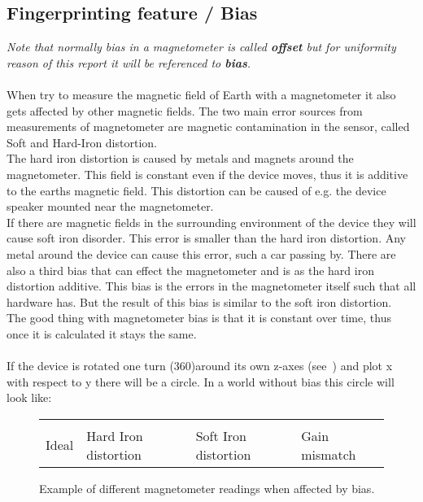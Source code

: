 \subsection{Fingerprinting feature / Bias}
\textit{Note that normally bias in a magnetometer is called \textbf{offset} but for uniformity reason of this report it will be referenced to \textbf{bias}.}\\
\\
When try to measure the magnetic field of Earth with a magnetometer it also gets affected by other magnetic fields. The two main error sources from measurements of magnetometer are magnetic contamination in the sensor, called Soft and Hard-Iron distortion. \\
The hard iron distortion is caused by metals and magnets around the magnetometer. This field is constant even if the device moves, thus it is additive to the earths magnetic field. This distortion can be caused of e.g. the device speaker mounted near the magnetometer. \\
If there are magnetic fields in the surrounding environment of the device they will cause soft iron disorder. This error is smaller than the hard iron distortion. Any metal around the device can cause this error, such a car passing by.
There are also a third bias that can effect the magnetometer and is as the hard iron distortion additive. This bias is the errors in the magnetometer itself such that all hardware has. But the result of this bias is similar to the soft iron distortion.  \\
The good thing with magnetometer bias is that it is constant over time, thus once it is calculated it stays the same. \\
\\
If the device is rotated one turn (360\degree)around its own z-axes (see~) and plot x with respect to y there will be a circle. In a world without bias this circle will look like:
\begin{figure}[H]
\begin{tabular}{p{} p{} p{} p{}}
        \vspace{0pt}  & 
        \vspace{0pt}  & 
        \vspace{0pt}  & 
        \vspace{0pt}  \\
        \vspace{0pt} Ideal & Hard Iron distortion & Soft Iron distortion & Gain mismatch \\
\end{tabular}
\caption{Example of different magnetometer readings when affected by bias.}\label{fig:magnCircle}
\end{figure}
\cite[]{liu:magnAcc}

